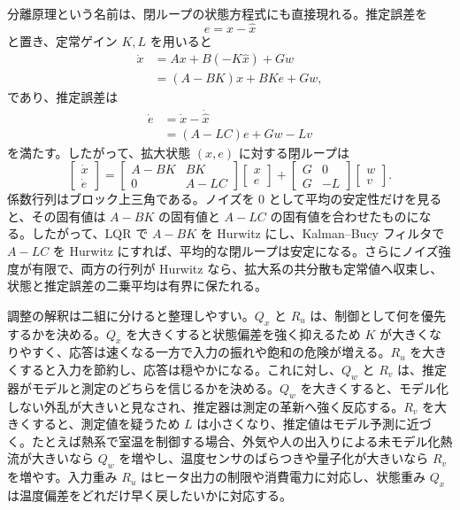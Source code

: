 分離原理という名前は、閉ループの状態方程式にも直接現れる。推定誤差を
\begin{equation}
  e=x-\hat{x}
\end{equation}
と置き、定常ゲイン $K,L$ を用いると
\begin{align}
  \dot{x}
  &=Ax+B(-K\hat{x})+Gw\\
  &=(A-BK)x+BKe+Gw,
\end{align}
であり、推定誤差は
\begin{align}
  \dot{e}
  &=\dot{x}-\dot{\hat{x}}\\
  &=(A-LC)e+Gw-Lv
\end{align}
を満たす。したがって、拡大状態 $(x,e)$ に対する閉ループは
\begin{equation}
  \begin{bmatrix}
    \dot{x}\\
    \dot{e}
  \end{bmatrix}
  =
  \begin{bmatrix}
    A-BK & BK\\
    0 & A-LC
  \end{bmatrix}
  \begin{bmatrix}
    x\\
    e
  \end{bmatrix}
  +
  \begin{bmatrix}
    G & 0\\
    G & -L
  \end{bmatrix}
  \begin{bmatrix}
    w\\
    v
  \end{bmatrix}.
  \label{eq:lqg-augmented-dynamics}
\end{equation}
係数行列はブロック上三角である。ノイズを 0 として平均の安定性だけを見ると、その固有値は $A-BK$ の固有値と $A-LC$ の固有値を合わせたものになる。したがって、LQR で $A-BK$ を Hurwitz にし、Kalman--Bucy フィルタで $A-LC$ を Hurwitz にすれば、平均的な閉ループは安定になる。さらにノイズ強度が有限で、両方の行列が Hurwitz なら、拡大系の共分散も定常値へ収束し、状態と推定誤差の二乗平均は有界に保たれる。

調整の解釈は二組に分けると整理しやすい。$Q_x$ と $R_u$ は、制御として何を優先するかを決める。$Q_x$ を大きくすると状態偏差を強く抑えるため $K$ が大きくなりやすく、応答は速くなる一方で入力の振れや飽和の危険が増える。$R_u$ を大きくすると入力を節約し、応答は穏やかになる。これに対し、$Q_w$ と $R_v$ は、推定器がモデルと測定のどちらを信じるかを決める。$Q_w$ を大きくすると、モデル化しない外乱が大きいと見なされ、推定器は測定の革新へ強く反応する。$R_v$ を大きくすると、測定値を疑うため $L$ は小さくなり、推定値はモデル予測に近づく。たとえば熱系で室温を制御する場合、外気や人の出入りによる未モデル化熱流が大きいなら $Q_w$ を増やし、温度センサのばらつきや量子化が大きいなら $R_v$ を増やす。入力重み $R_u$ はヒータ出力の制限や消費電力に対応し、状態重み $Q_x$ は温度偏差をどれだけ早く戻したいかに対応する。

